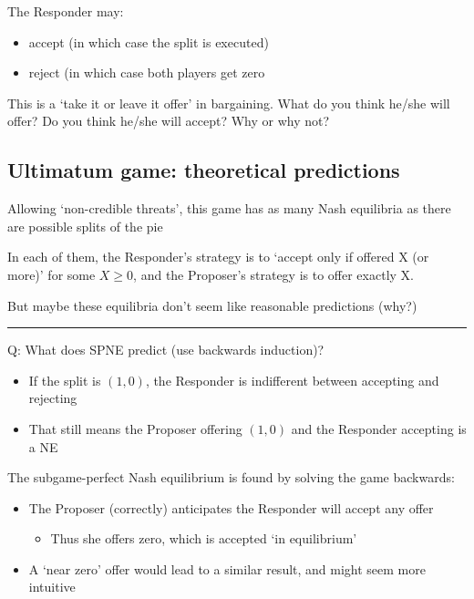 \documentclass[]{article}
\providecommand{\tightlist}{%
  \setlength{\itemsep}{0pt}\setlength{\parskip}{0pt}}
\begin{document}
The Responder may:

\begin{itemize}
\tightlist
\item
  accept (in which case the split is executed)
\item
  reject (in which case both players get zero
\end{itemize}

This is a `take it or leave it offer' in bargaining. What do you think he/she will offer? Do you think he/she will accept? Why or why not?

\hypertarget{ultimatum-game-theoretical-predictions}{%
\subsection{Ultimatum game: theoretical predictions}\label{ultimatum-game-theoretical-predictions}}

Allowing `non-credible threats', this game has as many Nash equilibria as there are possible splits of the pie

In each of them, the Responder's strategy is to `accept only if offered X (or more)' for some \(X\geq0\), and the Proposer's strategy is to offer exactly X.

But maybe these equilibria don't seem like reasonable predictions (why?)

\begin{center}\rule{0.5\linewidth}{\linethickness}\end{center}

Q: What does SPNE predict (use backwards induction)?

\begin{itemize}
\item
  If the split is \((1,0)\), the Responder is indifferent between accepting and rejecting
\item
  That still means the Proposer offering \((1,0)\) and the Responder accepting is a NE
\end{itemize}

The subgame-perfect Nash equilibrium is found by solving the game backwards:

\begin{itemize}
\tightlist
\item
  The Proposer (correctly) anticipates the Responder will accept any offer

  \begin{itemize}
  \tightlist
  \item
    Thus she offers zero, which is accepted `in equilibrium'
  \end{itemize}
\item
  A `near zero' offer would lead to a similar result, and might seem more intuitive
\end{itemize}
\end{document}
